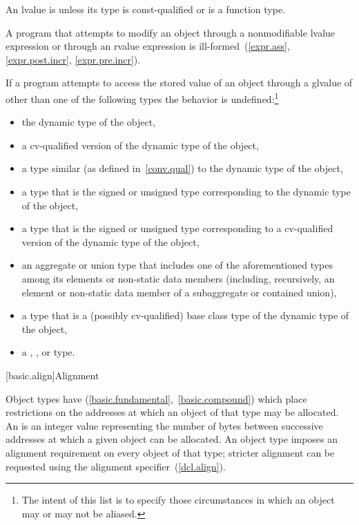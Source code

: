 \pnum
An lvalue is  unless its type is const-qualified
or is a function type.
\begin{note}
A program that attempts
to modify an object through a nonmodifiable lvalue expression or through an rvalue expression
is ill-formed~(\ref{expr.ass}, \ref{expr.post.incr}, \ref{expr.pre.incr}).
\end{note}

\pnum
If a program attempts to access the stored value of an object through a glvalue
of other than one of the following types the behavior is
undefined:\footnote{The intent of this list is to specify those circumstances in which an
object may or may not be aliased.}
\begin{itemize}
\item the dynamic type of the object,

\item a cv-qualified version of the dynamic type of the object,

\item a type similar (as defined in~\ref{conv.qual}) to the dynamic type
of the object,

\item a type that is the signed or unsigned type corresponding to the
dynamic type of the object,

\item a type that is the signed or unsigned type corresponding to a
cv-qualified version of the dynamic type of the object,

\item an aggregate or union type that includes one of the aforementioned types among its
elements or non-static data members (including, recursively, an element or non-static data member of a
subaggregate or contained union),

\item a type that is a (possibly cv-qualified) base class type of the dynamic type of
the object,

\item a , , or  type.
\end{itemize}

[basic.align]{Alignment}

\pnum
Object types have  (\ref{basic.fundamental},~\ref{basic.compound})
which place restrictions on the addresses at which an object of that type
may be allocated. An  is an 
integer value representing the number of bytes between successive addresses
at which a given object can be allocated. An object type imposes an alignment
requirement on every object of that type; stricter alignment can be requested
using the alignment specifier~(\ref{dcl.align}).

